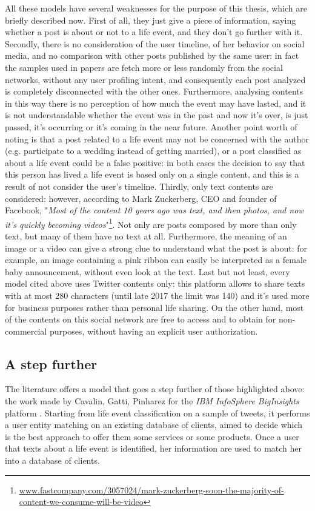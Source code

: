 All these models have several weaknesses for the purpose of this thesis, which are briefly described now. First of all, they just give a piece of information, saying whether a post is about or not to a life event, and they don't go further with it. Secondly, there is no consideration of the user timeline, of her behavior on social media, and no comparison with other posts published by the same user: in fact the samples used in papers are fetch more or less randomly from the social networks, without any user profiling intent, and consequently each post analyzed is completely disconnected with the other ones. Furthermore, analysing contents in this way there is no perception of how much the event may have lasted, and it is not understandable whether the event was in the past and now it's over, is just passed, it's occurring or it's coming in the near future. Another point worth of noting is that a post related to a life event may not be concerned with the author (e.g. participate to a wedding instead of getting married), or a post classified as about a life event could be a false positive: in both cases the decision to say that this person has lived a life event is based only on a single content, and this is a result of not consider the user's timeline. Thirdly, only text contents are considered: however, according to Mark Zuckerberg, CEO and founder of Facebook, "\textit{Most of the content 10 years ago was text, and then photos, and now it's quickly becoming videos}"\footnote{\url{www.fastcompany.com/3057024/mark-zuckerberg-soon-the-majority-of-content-we-consume-will-be-video}}. Not only are posts composed by more than only text, but many of them have no text at all. Furthermore, the meaning of an image or a video can give a strong clue to understand what the post is about: for example, an image containing a pink ribbon can easily be interpreted as a female baby announcement, without even look at the text. Last but not least, every model cited above uses Twitter contents only: this platform allows to share texts with at most 280 characters (until late 2017 the limit was 140) and it's used more for business purposes rather than personal life sharing. On the other hand, most of the contents on this social network are free to access and to obtain for non-commercial purposes, without having an explicit user authorization.

\subsection{A step further}
The literature offers a model that goes a step further of those highlighted above: the work made by Cavalin, Gatti, Pinharez for the \emph{IBM InfoSphere BigInsights} platform \cite{cavalin2014towards}. Starting from life event classification on a sample of tweets, it performs a user entity matching on an existing database of clients, aimed to decide which is the best approach to offer them some services or some products. Once a user that texts about a life event is identified, her information are used to match her into a database of clients.

